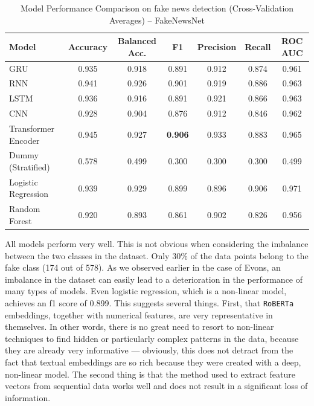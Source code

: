 \documentclass[a4paper,twoside,12pt]{book}
\begin{document}
\begin{table}[h!]
	\centering
	\caption{Model Performance Comparison on fake news detection (Cross-Validation Averages) -- FakeNewsNet}
	\label{tab:results_fakenewsnet_detection}
	\vspace{0.5em}
	\begin{tabular}{lcccccc}
		\hline
		\textbf{Model} & \textbf{Accuracy} & \textbf{Balanced Acc.} & \textbf{F1} & \textbf{Precision} & \textbf{Recall} & \textbf{ROC AUC} \\
		\hline
		GRU          & 0.935 & 0.918 & 0.891 & 0.912 & 0.874 & 0.961 \\
		RNN                        & 0.941 & 0.926 & 0.901 & 0.919 & 0.886 & 0.963 \\
		LSTM                       & 0.936 & 0.916 & 0.891 & 0.921 & 0.866 & 0.963 \\
		CNN                       & 0.928 & 0.904 & 0.876 & 0.912 & 0.846 & 0.962 \\
		Transformer Encoder               & 0.945 & 0.927 & \textbf{0.906} & 0.933 & 0.883 & 0.965 \\
		\hline
		Dummy (Stratified)         & 0.578 & 0.499 & 0.300 & 0.300 & 0.300 & 0.499 \\
		Logistic Regression        & 0.939 & 0.929 & 0.899 & 0.896 & 0.906 & 0.971 \\
		Random Forest              & 0.920 & 0.893 & 0.861 & 0.902 & 0.826 & 0.956 \\
		\hline
	\end{tabular}
\end{table}


All models perform very well. This is not obvious when considering the imbalance between the two classes in the dataset. Only 30\% of the data points belong to the fake class (174 out of 578). As we observed earlier in the case of Evons, an imbalance in the dataset can easily lead to a deterioration in the performance of many types of models. Even logistic regression, which is a non-linear model, achieves an f1 score of 0.899. This suggests several things. First, that \texttt{RoBERTa} embeddings, together with numerical features, are very representative in themselves. In other words, there is no great need to resort to non-linear techniques to find hidden or particularly complex patterns in the data, because they are already very informative — obviously, this does not detract from the fact that textual embeddings are so rich because they were created with a deep, non-linear model. The second thing is that the method used to extract feature vectors from sequential data works well and does not result in a significant loss of information. \\
\end{document}
